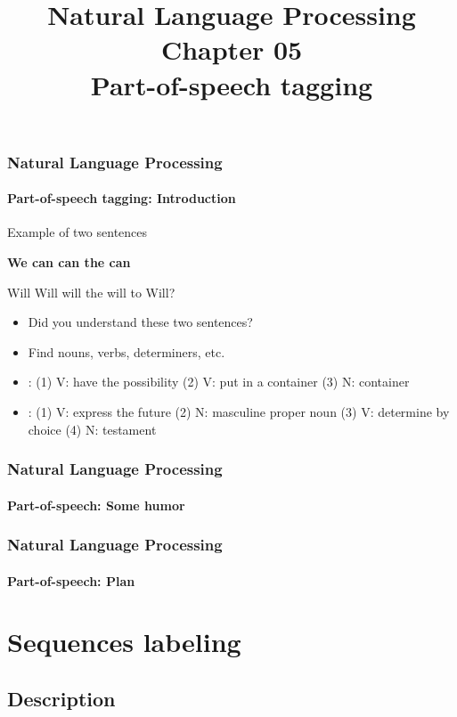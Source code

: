 \documentclass[xcolor=table]{beamer}
\title[ESI - NLP: 05- PoS tagging]%
{Natural Language Processing\\Chapter 05\\Part-of-speech tagging}
\begin{document}
	
\begin{frame}
\frametitle{Natural Language Processing}
\framesubtitle{Part-of-speech tagging: Introduction}

\begin{exampleblock}{Example of two sentences}
	\begin{center}
		\Huge\bfseries
		We can can the can
		
		Will Will will the will to Will?
	\end{center}
\end{exampleblock}

\begin{itemize}
	\item Did you understand these two sentences?
	\item Find nouns, verbs, determiners, etc.
	\item {}: (1) V: have the possibility (2) V: put in a container (3) N: container
	\item {}: (1) V: express the future (2) N: masculine proper noun (3) V: determine by choice (4) N: testament
\end{itemize}

\end{frame}

\begin{frame}
\frametitle{Natural Language Processing}
\framesubtitle{Part-of-speech: Some humor}

\begin{center}
\end{center}

\end{frame}

\begin{frame}
\frametitle{Natural Language Processing}
\framesubtitle{Part-of-speech: Plan}

\begin{multicols}{2}
\tableofcontents
\end{multicols}
\end{frame}

\section{Sequences labeling}

\subsection{Description}
\end{document}
